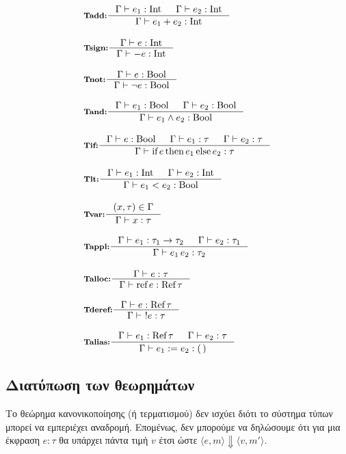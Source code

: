 \documentclass[12pt]{article}
\newcommand{\spacing}{1em}
\begin{document}
\vspace{2em}
\begin{align}
&\inference[\textbf{Tadd:}]{
    \Gamma |- e_1 : \textrm{Int}  &&
    \Gamma |- e_2 : \textrm{Int}
}{
    \Gamma |- e_1 + e_2 : \textrm{Int}
}
\\[\spacing]
&\inference[\textbf{Tsign:}]{
    \Gamma |- e : \textrm{Int}
}{
    \Gamma |- -e : \textrm{Int}
}
\\[\spacing]
&\inference[\textbf{Tnot:}]{
    \Gamma |- e : \textrm{Bool}
}{
    \Gamma |- \neg e : \textrm{Bool}
}
\\[\spacing]
&\inference[\textbf{Tand:}]{
    \Gamma |- e_1 : \textrm{Bool} &
    \Gamma |- e_2 : \textrm{Bool}
}{
    \Gamma |-  e_1 \wedge e_2 : \textrm{Bool}
}
\\[\spacing]
&\inference[\textbf{Tif:}]{
    \Gamma |- e : \textrm{Bool} &
    \Gamma |- e_1 : \tau &
    \Gamma |- e_2 : \tau
}{
    \Gamma |- \textrm{if}\, e\, \textrm{then}\, e_1\, \textrm{else}\, e_2 : \tau
}
\\[\spacing]
&\inference[\textbf{Tlt:}]{
    \Gamma |- e_1 : \textrm{Int} &
    \Gamma |- e_2 : \textrm{Int}
}{
    \Gamma |- e_1 < e_2 : \textrm{Bool}
}
\\[\spacing]
&\inference[\textbf{Tvar:}]{
    (x,\tau) \in \Gamma
}{
    \Gamma |- x : \tau
}
\\[\spacing]
&\inference[\textbf{Tappl:}]{
    \Gamma |- e_1 : \tau_1 -> \tau_2 &
    \Gamma |- e_2 : \tau_1
}{
    \Gamma |- e_1 \, e_2: \tau_2
}
\\[\spacing]
&\inference[\textbf{Talloc:}]{
    \Gamma |- e : \tau
}{
    \Gamma |- \textrm{ref}\, e : \textrm{Ref}\, \tau
}
\\[\spacing]
&\inference[\textbf{Tderef:}]{
    \Gamma |- e : \textrm{Ref}\, \tau
}{
    \Gamma |-~ ! e : \tau
}
\\[\spacing]
&\inference[\textbf{Talias:}]{\label{eq:Talias}
    \Gamma |- e_1 : \textrm{Ref}\, \tau &
    \Gamma |- e_2 : \tau
}{
    \Gamma |- e_1 := e_2 : (\,)
}
\end{align}

\subsection{\textgreek{Διατύπωση των θεωρημάτων}}
\label{sec:progress}
\label{sec:preservation}
\textgreek{Το θεώρημα κανονικοποίησης (ή τερματισμού) δεν
ισχύει διότι το σύστημα τύπων μπορεί να εμπεριέχει αναδρομή.
Επομένως, δεν μπορούμε να δηλώσουμε ότι για μια έκφραση 
$e : \tau$ θα υπάρχει πάντα τιμή $v$ έτσι ώστε 
$\langle e, m \rangle \Downarrow \langle v, m' \rangle$.}
\end{document}
